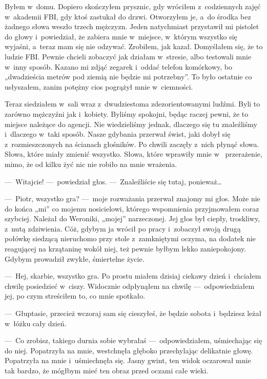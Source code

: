 Byłem w~domu. Dopiero skończyłem prysznic, gdy wróciłem z~codziennych zajęć w~akademii FBI, gdy ktoś zastukał do 
drzwi. Otworzyłem je, a~do środka bez żadnego słowa weszło trzech mężczyzn. Jeden natychmiast przystawił mi pistolet 
do głowy i~powiedział, że zabiera mnie w~miejsce, w~którym wszystko się wyjaśni, a~teraz mam się nie odzywać. 
Zrobiłem, jak kazał. Domyślałem się, że to ludzie FBI. Pewnie chcieli zobaczyć jak działam w~stresie, albo testowali 
mnie w~inny sposób. Kazano mi zdjąć zegarek i~oddać telefon komórkowy, bo „dwadzieścia metrów pod ziemią nie będzie 
mi potrzebny”. To było ostatnie co usłyszałem, zanim potężny cios pogrążył mnie w~ciemności.

Teraz siedziałem w~sali wraz z~dwudziestoma zdezorientowanymi ludźmi. Byli to zarówno mężczyźni jak i~kobiety. 
Byliśmy spokojni, będąc raczej pewni, że to miejsce należące do agencji. Nie wiedzieliśmy jednak, dlaczego się tu 
znaleźliśmy i~dlaczego w~taki sposób. Nasze gdybania przerwał świst, jaki dobył się z~rozmieszczonych na ścianach 
głośników. Po chwili zaczęły z~nich płynąć słowa. Słowa, które miały zmienić wszystko. Słowa, które wprawiły mnie w~
przerażenie, mimo, że od kilku żyć nic nie robiło na mnie wrażenia.

---~Witajcie! ---~powiedział głos. ---~Znaleźliście się tutaj, ponieważ…

---~Piotr, wszystko gra? ---~moje rozważania przerwał znajomy mi głos. Może nie do końca „mi” co mojemu nosicielowi, 
którego wspomnienia przyjmowałem coraz szybciej. Należał do Weroniki, „mojej” narzeczonej. Jej głos był ciepły, 
troskliwy, z~nutą zdziwienia. Cóż, gdybym ja wrócił po pracy i~zobaczył swoją drugą połówkę siedzącą nieruchomo przy 
stole z~zamkniętymi oczyma, na dodatek nie reagującej na krzątaninę wokół niej, też pewnie byłbym lekko 
zaniepokojony. Gdybym prowadził zwykłe, śmiertelne życie.

---~Hej, skarbie, wszystko gra. Po prostu miałem dzisiaj ciekawy dzień i~chciałem chwilę posiedzieć w~ciszy. 
Widocznie odpłynąłem na chwilę ---~odpowiedziałem jej, po czym streściłem to, co mnie spotkało.

---~Głuptasie, przecież wczoraj sam się cieszyłeś, że będzie sobota i~będziesz leżał w~łóżku cały dzień.

---~Co zrobisz, takiego durnia sobie wybrałaś ---~odpowiedziałem, uśmiechając się do niej. Popatrzyła na mnie, 
westchnęła głęboko przechylając delikatnie głowę. Popatrzyła na mnie i~uśmiechnęła się. Jasny gwint, ten widok 
oczarował mnie tak bardzo, że mógłbym mieć ten obraz przed oczami całe wieki. 


